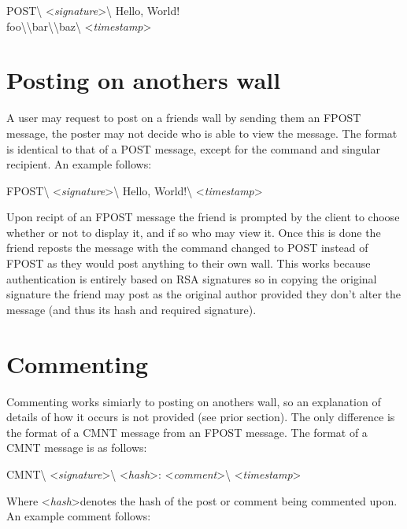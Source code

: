 \begin{center}
POST\textbackslash
\textless \textit{signature}\textgreater\textbackslash
Hello, World!\\
foo\textbackslash\textbackslash bar\textbackslash\textbackslash baz\textbackslash
\textless \textit{timestamp}\textgreater
\end{center}

\section{Posting on anothers wall}
A user may request to post on a friends wall by sending them an FPOST message,
the poster may not decide who is able to view the message. The format is
identical to that of a POST message, except for the command and singular
recipient. An example follows:

\begin{center}
FPOST\textbackslash
\textless \textit{signature}\textgreater\textbackslash
Hello, World!\textbackslash
\textless \textit{timestamp}\textgreater
\end{center}

Upon recipt of an FPOST message the friend is prompted by the client to choose
whether or not to display it, and if so who may view it. Once this is done the
friend reposts the message with the command changed to POST instead of FPOST as
they would post anything to their own wall. This works because authentication is
entirely based on RSA signatures so in copying the original signature the friend
may post as the original author provided they don't alter the message (and thus
its hash and required signature).

\section{Commenting}
Commenting works simiarly to posting on anothers wall, so an explanation of
details of how it occurs is not provided (see prior section). The only
difference is the format of a CMNT message from an FPOST message. The format of
a CMNT message is as follows:

\begin{center}
CMNT\textbackslash
\textless \textit{signature}\textgreater\textbackslash
\textless \textit{hash}\textgreater:
\textless \textit{comment}\textgreater\textbackslash
\textless \textit{timestamp}\textgreater
\end{center}

Where \textless \textit{hash}\textgreater denotes the hash of the post or
comment being commented upon. An example comment follows:

